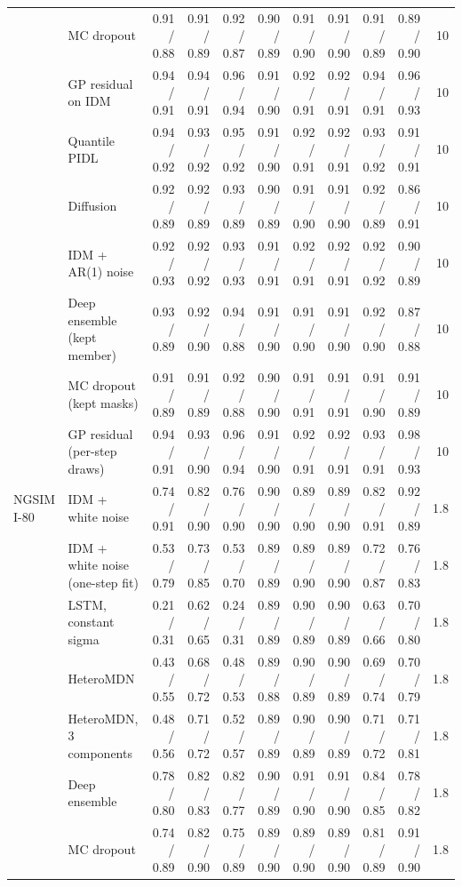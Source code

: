 \begin{longtable}{llrrrrrrrrr}
 & MC dropout & 0.91 / 0.88 & 0.91 / 0.89 & 0.92 / 0.87 & 0.90 / 0.89 & 0.91 / 0.90 & 0.91 / 0.90 & 0.91 / 0.89 & 0.89 / 0.90 & 10 \\
 & GP residual on IDM & 0.94 / 0.91 & 0.94 / 0.91 & 0.96 / 0.94 & 0.91 / 0.90 & 0.92 / 0.91 & 0.92 / 0.91 & 0.94 / 0.91 & 0.96 / 0.93 & 10 \\
 & Quantile PIDL & 0.94 / 0.92 & 0.93 / 0.92 & 0.95 / 0.92 & 0.91 / 0.90 & 0.92 / 0.91 & 0.92 / 0.91 & 0.93 / 0.92 & 0.91 / 0.91 & 10 \\
 & Diffusion & 0.92 / 0.89 & 0.92 / 0.89 & 0.93 / 0.89 & 0.90 / 0.89 & 0.91 / 0.90 & 0.91 / 0.90 & 0.92 / 0.89 & 0.86 / 0.91 & 10 \\
 & IDM + AR(1) noise & 0.92 / 0.93 & 0.92 / 0.92 & 0.93 / 0.93 & 0.91 / 0.91 & 0.92 / 0.91 & 0.92 / 0.91 & 0.92 / 0.92 & 0.90 / 0.89 & 10 \\
 & Deep ensemble (kept member) & 0.93 / 0.89 & 0.92 / 0.90 & 0.94 / 0.88 & 0.91 / 0.90 & 0.91 / 0.90 & 0.91 / 0.90 & 0.92 / 0.90 & 0.87 / 0.88 & 10 \\
 & MC dropout (kept masks) & 0.91 / 0.89 & 0.91 / 0.89 & 0.92 / 0.88 & 0.90 / 0.90 & 0.91 / 0.91 & 0.91 / 0.91 & 0.91 / 0.90 & 0.91 / 0.89 & 10 \\
 & GP residual (per-step draws) & 0.94 / 0.91 & 0.93 / 0.90 & 0.96 / 0.94 & 0.91 / 0.90 & 0.92 / 0.91 & 0.92 / 0.91 & 0.93 / 0.91 & 0.98 / 0.93 & 10 \\
\midrule
NGSIM I-80 & IDM + white noise & 0.74 / 0.91 & 0.82 / 0.90 & 0.76 / 0.90 & 0.90 / 0.90 & 0.89 / 0.90 & 0.89 / 0.90 & 0.82 / 0.91 & 0.92 / 0.89 & 1.8 \\
 & IDM + white noise (one-step fit) & 0.53 / 0.79 & 0.73 / 0.85 & 0.53 / 0.70 & 0.89 / 0.89 & 0.89 / 0.90 & 0.89 / 0.90 & 0.72 / 0.87 & 0.76 / 0.83 & 1.8 \\
 & LSTM, constant sigma & 0.21 / 0.31 & 0.62 / 0.65 & 0.24 / 0.31 & 0.89 / 0.89 & 0.90 / 0.89 & 0.90 / 0.89 & 0.63 / 0.66 & 0.70 / 0.80 & 1.8 \\
 & HeteroMDN & 0.43 / 0.55 & 0.68 / 0.72 & 0.48 / 0.53 & 0.89 / 0.88 & 0.90 / 0.89 & 0.90 / 0.89 & 0.69 / 0.74 & 0.70 / 0.79 & 1.8 \\
 & HeteroMDN, 3 components & 0.48 / 0.56 & 0.71 / 0.72 & 0.52 / 0.57 & 0.89 / 0.89 & 0.90 / 0.89 & 0.90 / 0.89 & 0.71 / 0.72 & 0.71 / 0.81 & 1.8 \\
 & Deep ensemble & 0.78 / 0.80 & 0.82 / 0.83 & 0.82 / 0.77 & 0.90 / 0.89 & 0.91 / 0.90 & 0.91 / 0.90 & 0.84 / 0.85 & 0.78 / 0.82 & 1.8 \\
 & MC dropout & 0.74 / 0.89 & 0.82 / 0.90 & 0.75 / 0.89 & 0.89 / 0.90 & 0.89 / 0.90 & 0.89 / 0.90 & 0.81 / 0.89 & 0.91 / 0.90 & 1.8 \\

\end{longtable}
